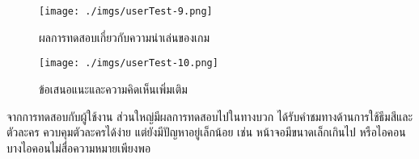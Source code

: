 \documentclass[12pt,oneside,openright,a4paper]{cpe-thai-project}
\begin{document}
\begin{figure}[H]\centering
  \texttt{[image: ./imgs/userTest-9.png]}
  \caption{ผลการทดสอบเกี่ยวกับความน่าเล่นของเกม}\label{fig:userTest-9}
\end{figure}

\begin{figure}[H]\centering
  \texttt{[image: ./imgs/userTest-10.png]}
  \caption{ข้อเสนอแนะและความคิดเห็นเพิ่มเติม}\label{fig:userTest-10}
\end{figure}

จากการทดสอบกับผู้ใช้งาน ส่วนใหญ่มีผลการทดสอบไปในทางบวก 
ได้รับคำชมทางด้านการใช้ธีมสีและตัวละคร ควบคุมตัวละครได้ง่าย 
แต่ยังมีปัญหาอยู่เล็กน้อย เช่น หน้าจอมีขนาดเล็กเกินไป หรือไอคอนบางไอคอนไม่สื่อความหมายเพียงพอ







\end{document}
